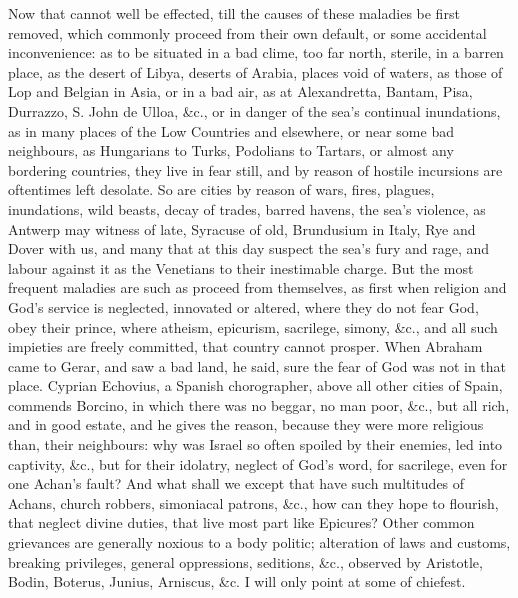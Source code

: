 {Now that cannot well be effected, till the causes of these maladies be
first removed, which commonly proceed from their own default, or some
accidental inconvenience: as to be situated in a bad clime, too far
north, sterile, in a barren place, as the desert of Libya, deserts of
Arabia, places void of waters, as those of Lop and Belgian in Asia, or
in a bad air, as at Alexandretta, Bantam, Pisa, Durrazzo, S. John de
Ulloa, \&c., or in danger of the sea's continual inundations, as in many
places of the Low Countries and elsewhere, or near some bad neighbours,
as Hungarians to Turks, Podolians to Tartars, or almost any bordering
countries, they live in fear still, and by reason of hostile incursions
are oftentimes left desolate. So are cities by reason of wars,
fires, plagues, inundations, wild beasts, decay of trades, barred
havens, the sea's violence, as Antwerp may witness of late, Syracuse of
old, Brundusium in Italy, Rye and Dover with us, and many that at this
day suspect the sea's fury and rage, and labour against it as the
Venetians to their inestimable charge. But the most frequent maladies
are such as proceed from themselves, as first when religion and God's
service is neglected, innovated or altered, where they do not fear God,
obey their prince, where atheism, epicurism, sacrilege, simony, \&c.,
and all such impieties are freely committed, that country cannot
prosper. When Abraham came to Gerar, and saw a bad land, he said, sure
the fear of God was not in that place.  Cyprian Echovius, a
Spanish chorographer, above all other cities of Spain, commends
Borcino, in which there was no beggar, no man poor, \&c., but all rich,
and in good estate, and he gives the reason, because they were more
religious than, their neighbours: why was Israel so often spoiled by
their enemies, led into captivity, \&c., but for their idolatry, neglect
of God's word, for sacrilege, even for one Achan's fault? And what
shall we except that have such multitudes of Achans, church robbers,
simoniacal patrons, \&c., how can they hope to flourish, that neglect
divine duties, that live most part like Epicures?
Other common grievances are generally noxious to a body politic;
alteration of laws and customs, breaking privileges, general
oppressions, seditions, \&c., observed by Aristotle, Bodin,
Boterus, Junius, Arniscus, \&c. I will only point at some of chiefest.

}
